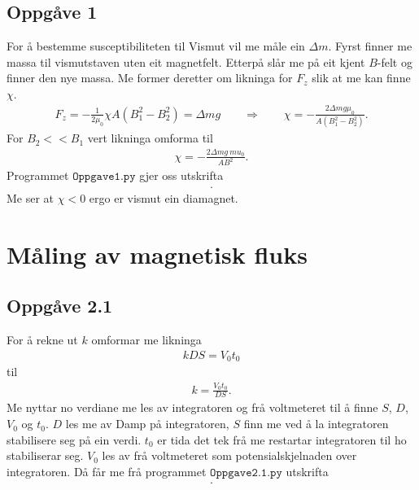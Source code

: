 \documentclass[11pt, a4paper]{article}
\begin{document}
  \subsection*{Oppgåve 1}
    For å bestemme susceptibiliteten til Vismut vil me måle ein $\Delta m$. Fyrst finner me massa til vismutstaven uten eit magnetfelt. Etterpå slår me på eit kjent 
    $B$-felt og finner den nye massa. Me former deretter om likninga for $F_z$ slik at me kan finne $\chi$.
    \begin{align*}
      F_z = -\frac{1}{2\mu_0}\chi A (B_1^2 - B_2^2) = \Delta mg \qquad \Rightarrow \qquad \chi = -\frac{2\Delta mg \mu_0}{A(B_1^2 - B_2^2)}.
    \end{align*}
    For $B_2 << B_1$ vert likninga omforma til
    \begin{align*}
      \chi = -\frac{2\Delta mg \ mu_0}{AB^2}.
    \end{align*}
    Programmet $\texttt{Oppgave1.py}$ gjer oss utskrifta 
    \begin{align*}
      .
    \end{align*}
    Me ser at $\chi < 0$ ergo er vismut ein diamagnet.


\newpage


\section*{Måling av magnetisk fluks}


  \subsection*{Oppgåve 2.1}
    For å rekne ut $k$ omformar me likninga
    \begin{align*}
      kDS = V_0t_0
    \end{align*}
    til
    \begin{align*}
      k = \frac{V_0t_0}{DS}.
    \end{align*}
    Me nyttar no verdiane me les av integratoren og frå voltmeteret til å finne $S$, $D$, $V_0$ og $t_0$. $D$ les me av Damp på integratoren, $S$
    finn me ved å la integratoren stabilisere seg på ein verdi. $t_0$ er tida det tek frå me restartar integratoren til ho stabiliserar seg. $V_0$ les av frå 
    voltmeteret som potensialskjelnaden over integratoren. Då får me frå programmet $\texttt{Oppgave2.1.py}$ utskrifta
      \begin{align*}
        .
      \end{align*}
\end{document}
